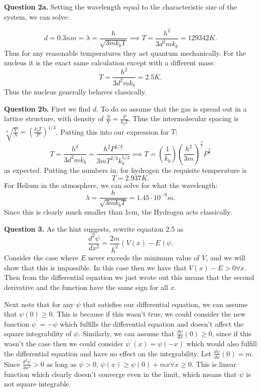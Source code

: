 \documentclass[letterpaper, reqno,11pt]{article}
\begin{document}
{\noindent\bf Question 2a.} Setting the wavelength equal to the characteristic size of the system, we can solve: 

\[
d=0.3nm=\lambda=\frac{h}{\sqrt{3mk_bT} }\implies T=\frac{h^2}{3d^2mk_b}=129342K
.\]
Thus for any reasonable temperatures they act quantum mechanically. For the nucleus it is the exact same calculation except with a different mass: 
\[
T=\frac{h^2}{3d^2mk_b}=2.5K
.\]
Thus the nucleus generally behaves classically. 

{\noindent\bf Question 2b.} First we find $d$. To do so assume that the gas is spread out in a lattice structure, with density of $\frac{N}{V}=\frac{P}{k_bT}$. Thus the intermolecular spacing is $ \sqrt[3]{\frac{V}{N}}=\left( \frac{k_bT}{P} \right)^{1 /3}$. Putting this into our expression for $T $: 
\[
T=\frac{h^2}{3d^2mk_b}=\frac{h^2P^{2 /3}}{3mT^{2/3}k_b^{5 /3}}\implies T=\left( \frac{1}{k_b} \right) \left( \frac{h^2}{3m} \right)^{\frac{3}{5}}P^{\frac{2}{5}} 
\]
as expected. Putting the numbers in, for hydrogen the requisite temperature is 
\[
T=2.937K
.\]
For Helium in the atmosphere, we can solve for what the wavelength:
\[
\lambda=\frac{h}{\sqrt{3mk_bT} }=1.45\cdot 10^{-9}m
.\]
Since this is clearly much smaller than 1cm, the Hydrogen acts classically. 

{\noindent\bf Question 3.} As the hint suggests, rewrite equation 2.5 as 
\[
\frac{d^2\psi}{dx^2}=\frac{2m}{\overline{h}^2}\left( V(x)-E \right) \psi
.\]
Consider the case where $E$ never exceeds the minimum value of $V$, and we will show that this is impossible. In this case then we have that $V(x)-E>0\forall x$. Then from the differential equation we just wrote out this means that the second derivative and the function have the same sign for all $x$. 

Next note that for any $\psi$ that satisfies our differential equation, we can assume that $\psi(0)\geq 0$. This is because if this wasn't true, we could consider the new function $\psi^\prime=-\psi$ which fulfills the differential equation and doesn't affect the square integrability of $\psi$. Similarly, we can assume that $\frac{d\psi}{dx}(0)\geq0$, since if this wasn't the case then we could consider $\psi^\prime(x)=\psi(-x)$ which would also fulfill the differential equation and have no effect on the integrability. Let $\frac{d\psi}{dx}(0)=m$. Since $\frac{d^2\psi}{dx^2}>0$ as long as $\psi>0$, $\psi(x)\geq \psi(0)+mx\forall x\geq0$. This is linear function which clearly doesn't converge even in the limit, which means that $\psi$ is not square integrable. 
\end{document}
